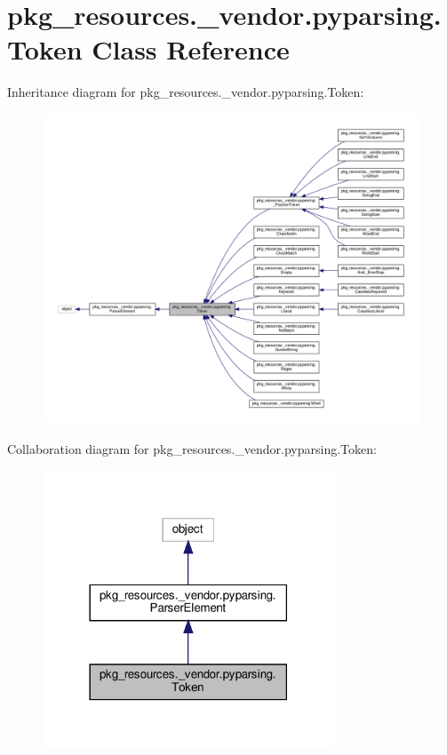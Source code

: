 \hypertarget{classpkg__resources_1_1__vendor_1_1pyparsing_1_1Token}{}\section{pkg\+\_\+resources.\+\_\+vendor.\+pyparsing.\+Token Class Reference}
\label{classpkg__resources_1_1__vendor_1_1pyparsing_1_1Token}


Inheritance diagram for pkg\+\_\+resources.\+\_\+vendor.\+pyparsing.\+Token\+:
\nopagebreak
\begin{figure}[H]
\begin{center}
\leavevmode
\includegraphics[width=350pt]{classpkg__resources_1_1__vendor_1_1pyparsing_1_1Token__inherit__graph}
\end{center}
\end{figure}


Collaboration diagram for pkg\+\_\+resources.\+\_\+vendor.\+pyparsing.\+Token\+:
\nopagebreak
\begin{figure}[H]
\begin{center}
\leavevmode
\includegraphics[width=246pt]{classpkg__resources_1_1__vendor_1_1pyparsing_1_1Token__coll__graph}
\end{center}
\end{figure}
